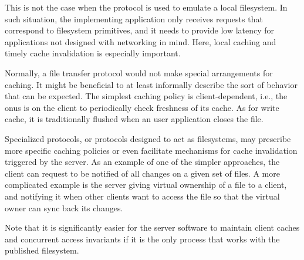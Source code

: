 This is not the case when the protocol is used to emulate a local filesystem. In such situation, the
implementing application only receives requests that correspond to filesystem primitives, and it needs to
provide low latency for applications not designed with networking in mind. Here, local caching and timely
cache invalidation is especially important.

Normally, a file transfer protocol would not make special arrangements for caching. It might be beneficial to
at least informally describe the sort of behavior that can be expected. The simplest caching policy is
client-dependent, i.e., the onus is on the client to periodically check freshness of its cache. As for write
cache, it is traditionally flushed when an user application closes the file.

Specialized protocols, or protocols designed to act as filesystems, may prescribe more specific caching
policies or even facilitate mechanisms for cache invalidation triggered by the server.  As an example of one
of the simpler approaches, the client can request to be notified of all changes on a given set of files.
A more complicated example is the server giving virtual ownership of a file to a client, and notifying it when
other clients want to access the file so that the virtual owner can sync back its changes.

Note that it is significantly easier for the server software to maintain client caches and concurrent access
invariants if it is the only process that works with the published filesystem.
